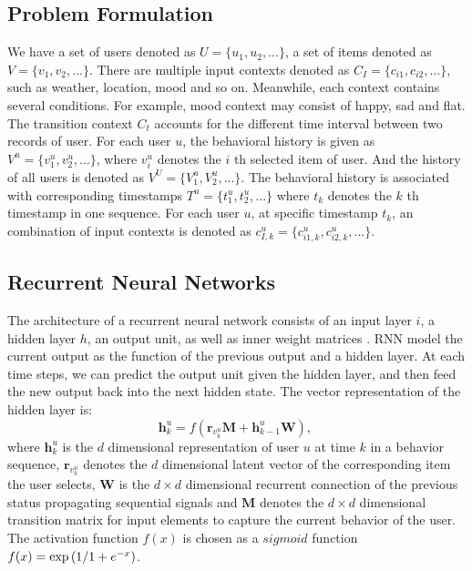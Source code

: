\documentclass[conference]{IEEEtran}
\begin{document}
\subsection{Problem Formulation}
We have a set of users denoted as $U  = \{ u_1 ,u_2 ,...\}$, a set of items denoted as $V  = \{ v_1 ,v_2 ,...\}$. There are multiple input contexts denoted as $C_I = \{c_{i1} ,c_{i2} ,...\}$, such as weather, location, mood and so on. Meanwhile, each context contains several conditions. For example, mood context may consist of happy, sad and flat. The transition context $C_t$ accounts for the different time interval between two records of user. For each user $u$, the behavioral history is given as $V^u = \{v^u_{1}, v^u_{2}, ...\}$, where $v^u_{i}$ denotes the $i$ th selected item of user. And the history of all users is denoted as $V^U = \{V^u_{1}, V^u_{2}, ...\}$. The behavioral history is associated with corresponding timestamps $T^u = \{t^u_{1}, t^u_{2}, ...\}$ where $t_k$ denotes the $k$ th timestamp in one sequence. For each user $u$, at specific timestamp $t_k$, an combination of input contexts is denoted as $c_{I,k}^{u} = \{
c_{i1,k}^{u},c_{i2,k}^{u},...\}$.






\subsection{ Recurrent Neural Networks}
The architecture of a recurrent neural network consists of an input layer $i$, a hidden layer $h$, an output unit, as well as inner weight matrices \cite{zhang2014sequential}. RNN model the current output as the function of the previous output and a hidden layer. At each time steps, we can predict the output unit given the hidden layer, and then feed the new output back into the next hidden state. The vector representation of the hidden layer is:
\begin{equation}  \label{eqHoriginal}
\mathbf{h}_{k}^{u}=f\left ( {\mathbf{r}_{v_{k}^{u}}}\mathbf{M}+\mathbf{h}_{k-1}^{u}\mathbf{W} \right),~
\end{equation}
where $\mathbf{h}^u_{k}$ is the $d$ dimensional representation of  user $u$ at time $k$ in a behavior sequence, $\mathbf{r}_{v_{k}^{u}}$ denotes the $d$ dimensional latent vector of the corresponding item the user selects, $\mathbf{W}$ is the $d \times d$ dimensional recurrent connection of the previous status propagating sequential signals and $\mathbf{M}$ denotes the $d \times d$ dimensional transition matrix for input elements to capture the current behavior of the user. The activation function $f(x)$ is chosen as a $sigmoid$ function $f(x) = \exp \left( {1 \mathord{\left/ \right. \kern-\nulldelimiterspace} 1 + e^{ - x} } \right)$.
\end{document}
